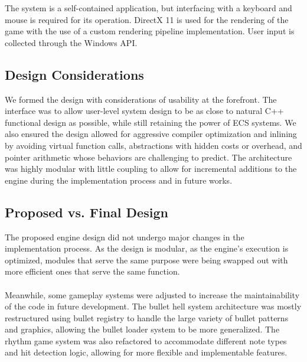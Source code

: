 The system is a self-contained application, but interfacing with a keyboard and mouse is required for its operation.
DirectX 11 is used for the rendering of the game with the use of a custom rendering pipeline implementation.
User input is collected through the Windows API\@.

\subsection{Design Considerations}
\label{subsec:design-considerations}

We formed the design with considerations of usability at the forefront.
The interface was to allow user-level system design to be as close to natural C++ functional design as possible,
while still retaining the power of ECS systems.
We also ensured the design allowed for aggressive compiler optimization and inlining by avoiding virtual function calls,
abstractions with hidden costs or overhead, and pointer arithmetic whose behaviors are challenging to predict.
The architecture was highly modular with little coupling to allow for incremental additions to the engine during the
implementation process and in future works.

\subsection{Proposed vs. Final Design}
\label{subsec:proposed-vs-final}

The proposed engine design did not undergo major changes in the implementation process.
As the design is modular, as the engine's execution is optimized, modules that serve the same purpose were being swapped out
with more efficient ones that serve the same function.
\\\\
Meanwhile, some gameplay systems were adjusted to increase the maintainability of the code in future development.
The bullet hell system architecture was mostly restructured using bullet registry to handle the large variety of bullet
patterns and graphics, allowing the bullet loader system to be more generalized.
The rhythm game system was also refactored to accommodate different note types and hit detection logic, allowing for more flexible
and implementable features.

